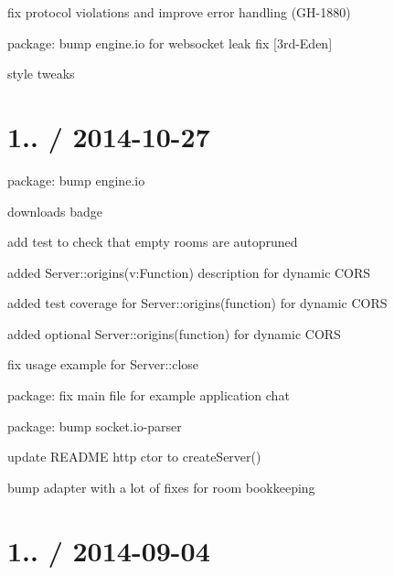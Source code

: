 \begin{DoxyItemize}
\item fix protocol violations and improve error handling (G\+H-\/1880)
\item package\+: bump {\ttfamily engine.\+io} for websocket leak fix \mbox{[}3rd-\/\+Eden\mbox{]}
\item style tweaks
\end{DoxyItemize}

\section*{1.. / 2014-\/10-\/27 }


\begin{DoxyItemize}
\item package\+: bump {\ttfamily engine.\+io}
\item downloads badge
\item add test to check that empty rooms are autopruned
\item added Server\+::origins(v\+:\+Function) description for dynamic C\+O\+RS
\item added test coverage for Server\+::origins(function) for dynamic C\+O\+RS
\item added optional Server\+::origins(function) for dynamic C\+O\+RS
\item fix usage example for Server\+::close
\item package\+: fix main file for example application \textquotesingle{}chat\textquotesingle{}
\item package\+: bump {\ttfamily socket.\+io-\/parser}
\item update R\+E\+A\+D\+ME http ctor to create\+Server()
\item bump adapter with a lot of fixes for room bookkeeping
\end{DoxyItemize}

\section*{1.. / 2014-\/09-\/04 }


